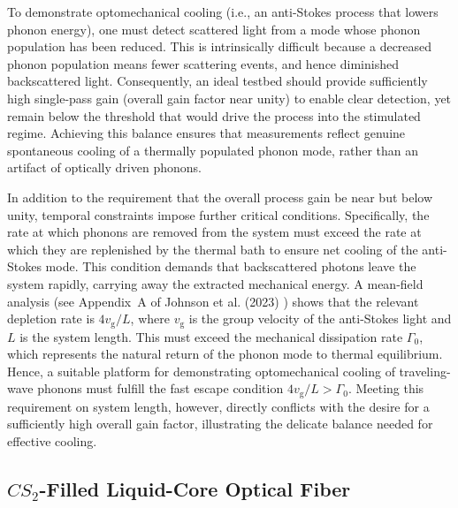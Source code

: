 To demonstrate optomechanical cooling (i.e., an anti-Stokes process that lowers phonon energy), one must detect scattered light from a mode whose phonon population has been reduced. This is intrinsically difficult because a decreased phonon population means fewer scattering events, and hence diminished backscattered light. Consequently, an ideal testbed should provide sufficiently high single-pass gain (overall gain factor near unity) to enable clear detection, yet remain below the threshold that would drive the process into the stimulated regime. Achieving this balance ensures that measurements reflect genuine spontaneous cooling of a thermally populated phonon mode, rather than an artifact of optically driven phonons.

In addition to the requirement that the overall process gain be near but below unity, temporal constraints impose further critical conditions. Specifically, the rate at which phonons are removed from the system must exceed the rate at which they are replenished by the thermal bath to ensure net cooling of the anti-Stokes mode. This condition demands that backscattered photons leave the system rapidly, carrying away the extracted mechanical energy. A mean-field analysis (see Appendix~A of Johnson et al. (2023) \cite{johnson2023laser}) shows that the relevant depletion rate is \(4v_{\mathrm{g}}/L\), where \(v_{\mathrm{g}}\) is the group velocity of the anti-Stokes light and \(L\) is the system length. This must exceed the mechanical dissipation rate \(\Gamma_{\mathrm{0}}\), which represents the natural return of the phonon mode to thermal equilibrium. Hence, a suitable platform for demonstrating optomechanical cooling of traveling-wave phonons must fulfill the fast escape condition \(4v_{\mathrm{g}}/L > \Gamma_{\mathrm{0}}\). Meeting this requirement on system length, however, directly conflicts with the desire for a sufficiently high overall gain factor, illustrating the delicate balance needed for effective cooling.


\subsection{\texorpdfstring{$CS_{2}$}{CS2}-Filled Liquid-Core Optical Fiber}
\label{Cooling:subsec:CS2FilledLCOF}

